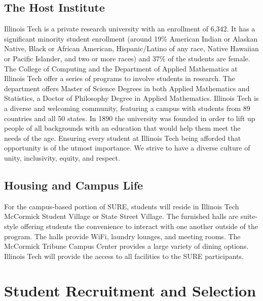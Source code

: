 \documentclass[11pt]{NSFamsart}
\begin{document}
\subsection{The Host Institute}
Illinois Tech is a private research university with an enrollment of 6,342. It has a significant minority student enrollment (around 19\% American Indian or Alaskan Native, Black or African American, Hispanic/Latino of any race, Native Hawaiian or Pacific Islander, and two or more races) and 37\% of the students are female. The College of Computing
and the Department of Applied Mathematics at Illinois Tech offer a series of programs to involve students
in research. The department offers Master of Science Degrees
in both Applied Mathematics and Statistics, a Doctor of Philosophy Degree in Applied Mathematics.  Illinois Tech is a diverse and welcoming community, featuring a campus with students from 89 countries and all 50 states. In 1890 the university was founded in order to lift up people of all backgrounds with an education that would help them meet the needs of the age. Ensuring every student at Illinois Tech being afforded that opportunity is of the utmost importance.
We strive to have a diverse culture of unity, inclusivity, equity, and respect.

\subsection{Housing and Campus Life} For the campus-based portion of SURE, students
will reside in Illinois Tech McCormick Student Village or State Street Village. The furnished halls are suite-style offering students the
convenience to interact with one another outside of the program. The halls provide WiFi, laundry
lounges, and meeting rooms. The McCormick Tribune Campus Center provides a large variety of dining options. Illinois Tech will provide the access to all facilities to the SURE participants. 

\section{Student Recruitment and Selection}
\end{document}

